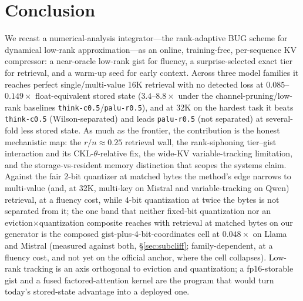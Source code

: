 \documentclass[11pt]{article}
\begin{document}
\section{Conclusion}
\label{sec:conc}
We recast a numerical-analysis integrator---the rank-adaptive BUG scheme for
dynamical low-rank approximation---as an online, training-free, per-sequence KV
compressor: a near-oracle low-rank gist for fluency, a surprise-selected exact
tier for retrieval, and a warm-up seed for early context. Across three model
families it reaches perfect single/multi-value 16K retrieval with no detected
loss at $0.085$--$0.149\times$ float-equivalent stored state
($3.4$--$8.8\times$ under the channel-pruning/low-rank baselines
\texttt{think-c0.5}/\texttt{palu-r0.5}), and at 32K on the hardest task it beats
\texttt{think-c0.5} (Wilson-separated) and leads \texttt{palu-r0.5}
(not separated) at several-fold less stored state. As much as the frontier,
the contribution is the honest mechanistic map: the $r/n\approx0.25$ retrieval
wall, the rank-siphoning tier--gist interaction and its CKL-$\theta$-relative fix,
the wide-KV variable-tracking limitation, and the storage-vs-resident memory
distinction that scopes the systems claim. Against the fair 2-bit quantizer at matched bytes the method's edge narrows
to multi-value (and, at 32K, multi-key on Mistral and variable-tracking on Qwen)
retrieval, at a fluency cost, while 4-bit quantization at twice the bytes is not
separated from it; the one band that neither fixed-bit quantization nor an
eviction$\times$quantization composite reaches with retrieval at matched bytes on our
generator is the composed gist-plus-4-bit-coordinates cell at $0.048\times$ on Llama
and Mistral (measured against both, \S\ref{sec:subcliff}; family-dependent, at a
fluency cost, and not yet on the official anchor, where the cell collapses). Low-rank tracking is an axis orthogonal to eviction and
quantization; a fp16-storable gist and a fused factored-attention kernel are the
program that would turn today's stored-state advantage into a deployed one.

\small


\end{document}

